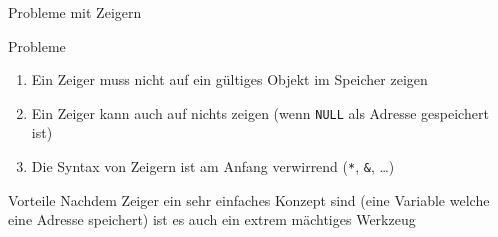 \documentclass[presentation]{beamer}
\begin{document}
\begin{frame}[fragile,label={sec:org23db211}]{Probleme mit Zeigern}
 \begin{block}{Probleme}
\begin{enumerate}
\item Ein Zeiger muss nicht auf ein gültiges Objekt im Speicher zeigen
\item Ein Zeiger kann auch auf nichts zeigen (wenn {\color{solarizedYellow}\texttt{NULL} }als Adresse
gespeichert ist)
\item Die Syntax von Zeigern ist am Anfang verwirrend ({\color{solarizedYellow}\texttt{*}}, {\color{solarizedYellow}\texttt{\&}}, \ldots{})
\end{enumerate}
\end{block}
\begin{block}{Vorteile}
Nachdem Zeiger ein sehr einfaches Konzept sind (eine Variable welche
eine Adresse speichert) ist es auch ein extrem mächtiges Werkzeug
\end{block}
\end{frame}
\end{document}
